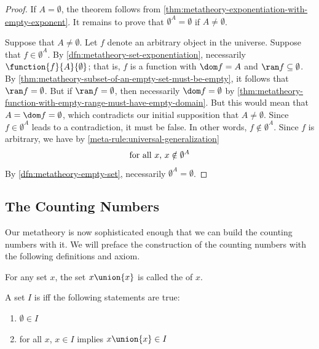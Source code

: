 \begin{proof}
    If \( A = \emptyset \), the theorem follows from \cref{thm:metatheory-exponentiation-with-empty-exponent}.
    It remains to prove that \( \emptyset^{A} = \emptyset \) if \( A \neq \emptyset \).

    \vspace{0.3cm}
    \noindent
    Suppose that \( A \neq \emptyset \).
    Let \( f \) denote an arbitrary object in the universe.
    Suppose that \( f \in \emptyset^{A} \).
    By \cref{dfn:metatheory-set-exponentiation}, necessarily \( \function{f}{A}{\emptyset} \);
    that is, \( f \) is a function with \( \dom f = A \) and \( \ran f \subseteq \emptyset \).
    By \cref{thm:metatheory-subset-of-an-empty-set-must-be-empty}, it follows that \( \ran f = \emptyset \).
    But if \( \ran f = \emptyset \), then necessarily \( \dom f = \emptyset \) by \cref{thm:metatheory-function-with-empty-range-must-have-empty-domain}.
    But this would mean that \( A = \dom f = \emptyset \), which contradicts our initial supposition that \( A \neq \emptyset \).
    Since \( f \in \emptyset^{A} \) leads to a contradiction, it must be false. In other words, \( f \notin \emptyset^{A} \).
    Since \( f \) is arbitrary, we have by \cref{meta-rule:universal-generalization}
    \begin{equation*}
        \text{for all \( x \), \( x \notin \emptyset^{A} \)}
    \end{equation*}
    By \cref{dfn:metatheory-empty-set}, necessarily \( \emptyset^{A} = \emptyset \).
\end{proof}



\subsection{The Counting Numbers}
Our metatheory is now sophisticated enough that we can build the counting numbers with it.
We will preface the construction of the counting numbers with the following definitions and axiom.

\begin{dfn}[Successor]
     \label{dfn:metatheory-successor}
    For any set \( x \), the set \( x \union \mleft\{ x \mright\} \) is called the  of \( x \).
\end{dfn}

\begin{dfn}
     \label{dfn:metatheory-inductive-set}
    A set \( I \) is  iff the following statements are true:
    \begin{enumerate}[topsep=2pt, label=\textup{\texttt{(\alph*)}}]
        \item \( \emptyset \in I \)
        \item for all \( x \), \( x \in I \) implies \( x \union \mleft\{ x \mright\} \in I \)
    \end{enumerate}
\end{dfn}

